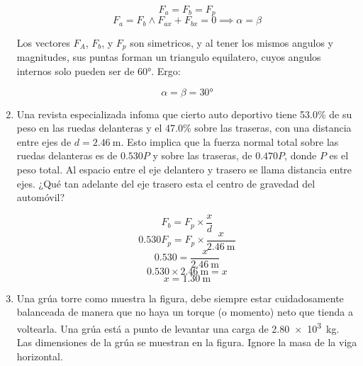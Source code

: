 \documentclass[../practica.root.tex]{subfiles}
\begin{document}
\begin{enumerate}
\begin{multicols}{2}
\begin{center}
		      \end{center}

		      \[F_a=F_b=F_p\]
		      \[F_a=F_b\land F_{ax}+F_{bx}=0\implies\alpha=\beta\]

		      Los vectores $F_A$, $F_b$, y $F_p$ son simetricos, y al tener los mismos angulos y magnitudes, sus puntas forman un triangulo equilatero, cuyos angulos internos solo pueden ser de \ang{60}. Ergo:

		      \[\boxed{\alpha=\beta=\ang{30}}\]
	      \end{multicols}

	\item Una revista especializada infoma que cierto auto deportivo tiene \num{53,0}\% de su peso en las ruedas delanteras y el \num{47,0}\% sobre las traseras, con una distancia entre ejes de $d=\SI{2,46}{\meter}$. Esto implica que la fuerza normal total sobre las ruedas delanteras es de $\num{0,530}P$ y sobre las traseras, de $\num{0,470}P$, donde $P$ es el peso total. Al espacio entre el eje delantero y trasero se llama distancia entre ejes. ¿Qué tan adelante del eje trasero esta el centro de gravedad del automóvil?

	      \begin{multicols}{2}
		      \begin{center}
		      \end{center}

		      \[F_b=F_p\times\frac{x}{d}\]
		      \[\num{0,530}F_p=F_p\times\frac{x}{\SI{2,46}{\meter}}\]
		      \[\num{0,530}=\frac{x}{\SI{2,46}{\meter}}\]
		      \[\num{0,530}\times\SI{2,46}{\meter}=x\]
		      \[x=\boxed{\SI{1,30}{\meter}}\]
	      \end{multicols}

	      \newpage
	\item Una grúa torre como muestra la figura, debe siempre estar cuidadosamente balanceada de manera que no haya un torque (o momento) neto que tienda a voltearla. Una grúa está a punto de levantar una carga de \SI{2,80e3}{\kilogram}. Las dimensiones de la grúa se muestran en la figura. Ignore la masa de la viga horizontal.


\end{enumerate}
\end{document}
